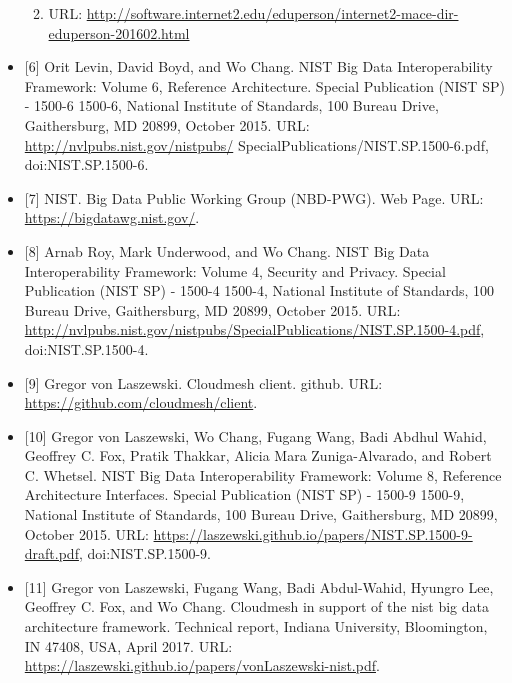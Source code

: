 \documentclass[9pt,]{article}
\providecommand{\tightlist}{%
  \setlength{\itemsep}{0pt}\setlength{\parskip}{0pt}}
\begin{document}
\begin{itemize}
  \begin{enumerate}
  \def\labelenumi{\arabic{enumi}.}
  \setcounter{enumi}{2015}
  \tightlist
  \item
    URL:
    \url{http://software.internet2.edu/eduperson/internet2-mace-dir-eduperson-201602.html}
  \end{enumerate}
\item
  {[}6{]} Orit Levin, David Boyd, and Wo Chang. NIST Big Data
  Interoperability Framework: Volume 6, Reference Architecture. Special
  Publication (NIST SP) - 1500-6 1500-6, National Institute of
  Standards, 100 Bureau Drive, Gaithersburg, MD 20899, October 2015.
  URL: \url{http://nvlpubs.nist.gov/nistpubs/}
  SpecialPublications/NIST.SP.1500-6.pdf, doi:NIST.SP.1500-6.
\item
  {[}7{]} NIST. Big Data Public Working Group (NBD-PWG). Web Page. URL:
  \url{https://bigdatawg.nist.gov/}.
\item
  {[}8{]} Arnab Roy, Mark Underwood, and Wo Chang. NIST Big Data
  Interoperability Framework: Volume 4, Security and Privacy. Special
  Publication (NIST SP) - 1500-4 1500-4, National Institute of
  Standards, 100 Bureau Drive, Gaithersburg, MD 20899, October 2015.
  URL:
  \url{http://nvlpubs.nist.gov/nistpubs/SpecialPublications/NIST.SP.1500-4.pdf},
  doi:NIST.SP.1500-4.
\item
  {[}9{]} Gregor von Laszewski. Cloudmesh client. github. URL:
  \url{https://github.com/cloudmesh/client}.
\item
  {[}10{]} Gregor von Laszewski, Wo Chang, Fugang Wang, Badi Abdhul
  Wahid, Geoffrey C. Fox, Pratik Thakkar, Alicia Mara Zuniga-Alvarado,
  and Robert C. Whetsel. NIST Big Data Interoperability Framework:
  Volume 8, Reference Architecture Interfaces. Special Publication (NIST
  SP) - 1500-9 1500-9, National Institute of Standards, 100 Bureau
  Drive, Gaithersburg, MD 20899, October 2015. URL:
  \url{https://laszewski.github.io/papers/NIST.SP.1500-9-draft.pdf},
  doi:NIST.SP.1500-9.
\item
  {[}11{]} Gregor von Laszewski, Fugang Wang, Badi Abdul-Wahid, Hyungro
  Lee, Geoffrey C. Fox, and Wo Chang. Cloudmesh in support of the nist
  big data architecture framework. Technical report, Indiana University,
  Bloomington, IN 47408, USA, April 2017. URL:
  \url{https://laszewski.github.io/papers/vonLaszewski-nist.pdf}.
\end{itemize}
\end{document}

